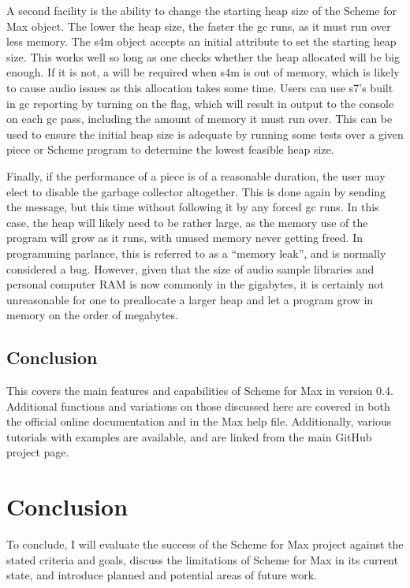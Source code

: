\documentclass[letterpaper,10pt,english]{sphinxmanual}
\begin{document}
\sphinxAtStartPar
A second facility is the ability to change the starting heap size of the Scheme for Max object.
The lower the heap size, the faster the gc runs, as it must run over less
memory. The s4m object accepts an initial
 attribute to set the starting heap size. This works well so
long as one checks whether the heap allocated will be big enough.
If it is not, a  will be required when s4m is out of memory,
which is likely to cause audio issues as this allocation takes some time.
Users can use s7’s built in gc reporting by turning on the  flag,
which will result in output to the console on each gc pass, including the
amount of memory it must run over. This can be used to ensure the initial
heap size is adequate by running some tests over a given piece or Scheme program
to determine the lowest feasible heap size.

\sphinxAtStartPar
Finally, if the performance of a piece is of a reasonable duration, the
user may elect to disable the garbage collector altogether.
This is done again by sending the  message, but this time without
following it by any forced gc runs. In this case, the heap will likely
need to be rather large, as the memory use of the program will grow as it
runs, with unused memory never getting freed. In programming parlance,
this is referred to as a “memory leak”, and is normally considered
a bug. However, given that the size of audio sample libraries and personal computer RAM
is now commonly in the gigabytes, it is certainly
not unreasonable for one to pre\sphinxhyphen{}allocate a larger heap and let a program grow
in memory on the order of megabytes.


\section{Conclusion}
\label{\detokenize{features_usage:conclusion}}
\sphinxAtStartPar
This covers the main features and capabilities of Scheme for Max
in version 0.4.
Additional functions and variations on those discussed here are
covered in both the official online documentation and in the Max help file.
Additionally, various tutorials with examples are available, and
are linked from the main GitHub project page.

\sphinxstepscope


\chapter{Conclusion}
\label{\detokenize{conclusion:conclusion}}\label{\detokenize{conclusion::doc}}
\sphinxAtStartPar
To conclude, I will evaluate the success of the Scheme for Max project
against the stated criteria and goals,
discuss the limitations of Scheme for Max in its current state, and introduce
planned and potential areas of future work.
\end{document}

